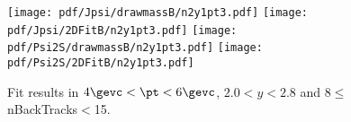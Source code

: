 \begin{figure}[H]
\begin{center}
\texttt{[image: pdf/Jpsi/drawmassB/n2y1pt3.pdf]}
\texttt{[image: pdf/Jpsi/2DFitB/n2y1pt3.pdf]}
\vspace*{-0.5cm}
\texttt{[image: pdf/Psi2S/drawmassB/n2y1pt3.pdf]}
\texttt{[image: pdf/Psi2S/2DFitB/n2y1pt3.pdf]}
\vspace*{-0.5cm}
\end{center}
\caption{Fit results in $4\gevc<\pt<6\gevc$, $2.0<y<2.8$ and 8$\leq$nBackTracks$<$15.}
\label{Fitn2y1pt3}
\end{figure}
